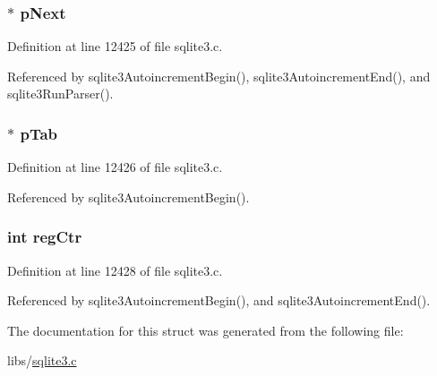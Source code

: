 \hypertarget{struct_autoinc_info_a02d0456863b04e2e0a5fbda5d737db51}{}
\subsubsection[{p\+Next}]{$\ast$ p\+Next}\label{struct_autoinc_info_a02d0456863b04e2e0a5fbda5d737db51}


Definition at line 12425 of file sqlite3.\+c.



Referenced by sqlite3\+Autoincrement\+Begin(), sqlite3\+Autoincrement\+End(), and sqlite3\+Run\+Parser().

\hypertarget{struct_autoinc_info_a11b1abc167f386db2ab7fc634c880c26}{}
\subsubsection[{p\+Tab}]{$\ast$ p\+Tab}\label{struct_autoinc_info_a11b1abc167f386db2ab7fc634c880c26}


Definition at line 12426 of file sqlite3.\+c.



Referenced by sqlite3\+Autoincrement\+Begin().

\hypertarget{struct_autoinc_info_a3cbb3487804a896dffcc588df2c08900}{}
\subsubsection[{reg\+Ctr}]{\setlength{\rightskip}{0pt plus 5cm}int reg\+Ctr}\label{struct_autoinc_info_a3cbb3487804a896dffcc588df2c08900}


Definition at line 12428 of file sqlite3.\+c.



Referenced by sqlite3\+Autoincrement\+Begin(), and sqlite3\+Autoincrement\+End().



The documentation for this struct was generated from the following file\+:\begin{DoxyCompactItemize}
\item 
libs/\hyperlink{sqlite3_8c}{sqlite3.\+c}\end{DoxyCompactItemize}
